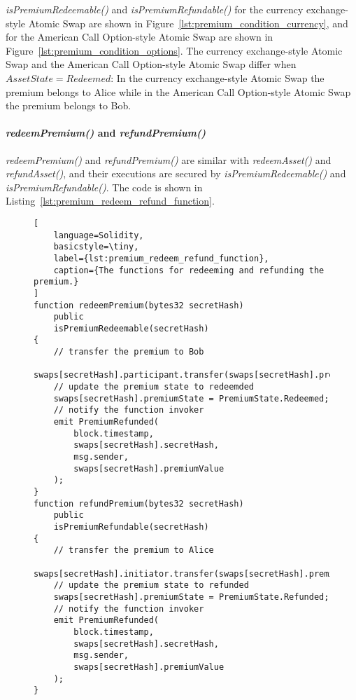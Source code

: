 \textit{isPremiumRedeemable()} and \textit{isPremiumRefundable()} for the currency exchange-style Atomic Swap are shown in Figure~\ref{lst:premium_condition_currency}, and for the American Call Option-style Atomic Swap are shown in Figure~\ref{lst:premium_condition_options}.
The currency exchange-style Atomic Swap and the American Call Option-style Atomic Swap differ when $AssetState = Redeemed$:
In the currency exchange-style Atomic Swap the premium belongs to Alice while in the American Call Option-style Atomic Swap the premium belongs to Bob.

\paragraph{\textit{redeemPremium()} and \textit{refundPremium()}}

\textit{redeemPremium()} and \textit{refundPremium()} are similar with \textit{redeemAsset()} and \textit{refundAsset()}, and their executions are secured by \textit{isPremiumRedeemable()} and \textit{isPremiumRefundable()}.
The code is shown in Listing~\ref{lst:premium_redeem_refund_function}.

\begin{figure}[htb]
\begin{lstlisting}[
    language=Solidity, 
    basicstyle=\tiny,
    label={lst:premium_redeem_refund_function},
    caption={The functions for redeeming and refunding the premium.}
]
function redeemPremium(bytes32 secretHash)
    public
    isPremiumRedeemable(secretHash)
{
    // transfer the premium to Bob
    swaps[secretHash].participant.transfer(swaps[secretHash].premiumValue);
    // update the premium state to redeemded
    swaps[secretHash].premiumState = PremiumState.Redeemed;
    // notify the function invoker
    emit PremiumRefunded(
        block.timestamp,
        swaps[secretHash].secretHash,
        msg.sender,
        swaps[secretHash].premiumValue
    );
}
function refundPremium(bytes32 secretHash)
    public
    isPremiumRefundable(secretHash)
{
    // transfer the premium to Alice
    swaps[secretHash].initiator.transfer(swaps[secretHash].premiumValue);
    // update the premium state to refunded
    swaps[secretHash].premiumState = PremiumState.Refunded;
    // notify the function invoker
    emit PremiumRefunded(
        block.timestamp,
        swaps[secretHash].secretHash,
        msg.sender,
        swaps[secretHash].premiumValue
    );
}
\end{lstlisting}
\end{figure}

